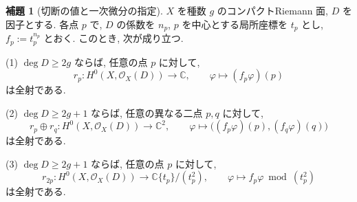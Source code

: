 \documentclass[dvipdfmx,a4paper,11pt]{article} %
\newcommand{\C}{\mathbb{C}}
\theoremstyle{definition}
\numberwithin{equation}{section}
\newtheorem{lem}[thm]{補題}
\begin{document}
\begin{lem}[切断の値と一次微分の指定]
\label{O-M334}\label{O-M335}\label{O-M336}
$X$ を種数 $g$ のコンパクトRiemann 面, $D$ を因子とする.
各点 $p$ で, $D$ の係数を $n_p$,
$p$ を中心とする局所座標を $t_p$ とし,
$f_p:=t_p^{n_p}$ とおく.
このとき, 次が成り立つ.

\medskip
\noindent
(1) $\deg D\geq2g$ ならば, 任意の点 $p$ に対して,
\[
r_p:H^0(X,\mathcal O_X(D))\longrightarrow\C,
\qquad \varphi\longmapsto(f_p\varphi)(p)
\]
は全射である.

\medskip
\noindent
(2) $\deg D\geq2g+1$ ならば, 任意の異なる二点 $p,q$ に対して,
\[
r_p\oplus r_q:H^0(X,\mathcal O_X(D))\longrightarrow\C^2,
\qquad
\varphi\longmapsto\bigl((f_p\varphi)(p),(f_q\varphi)(q)\bigr)
\]
は全射である.

\medskip
\noindent
(3) $\deg D\geq2g+1$ ならば, 任意の点 $p$ に対して,
\[
r_{2p}:H^0(X,\mathcal O_X(D))
\longrightarrow\C\{t_p\}/(t_p^2),
\qquad
\varphi\longmapsto f_p\varphi\bmod(t_p^2)
\]
は全射である.
\end{lem}
\end{document}
